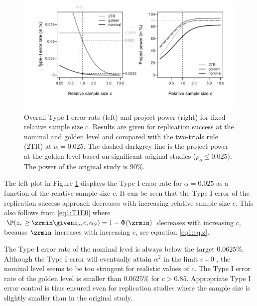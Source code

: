 \begin{figure}[!h]
\centering

\begin{knitrout}
\color{fgcolor}

{\centering \includegraphics[width=\maxwidth]{images/paper1/fig4-1}

}

\end{knitrout}

\caption{Overall Type I error rate (left) and project power (right) for fixed
  relative sample size $c$. Results are given for replication success at the
  nominal and golden level and compared with the two-trials rule (2TR) at
  $\alpha = 0.025$. The dashed darkgrey line is the project power at the golden
  level based on significant original studies ($p_o \leq 0.025$). The power of
  the original study is 90\%.}
\label{fig1:fig4}
\end{figure}


The left plot in Figure \ref{fig1:fig4} displays the Type I error rate for
$\alpha=0.025$ as a function of the relative sample size $c$. It can be seen
that the Type I error of the replication success approach decreases with
increasing relative sample size $c$. This also follows from \eqref{eq1:T1E0}
where \mbox{$\P(z_r \geq \zrmin \given z_o, c, \alpha_S) = 1 - \Phi(\zrmin)$}
decreases with increasing $c$, because $\zrmin$ increases with increasing $c$,
see equation \eqref{eq1:eq.z}.


The Type I error rate of the nominal level is always below the target
$0.0625$\%. Although the Type I error will eventually attain $\alpha^2$ in the
limit $c \downarrow 0$ \citep[Section 3.4]{Held2020}, the nominal level seems to
be too stringent for realistic values of $c$. The Type I error rate of the
golden level is smaller than $0.0625$\% for $c >0.85$. Appropriate Type I error
control is thus ensured even for replication studies where the sample size is
slightly smaller than in the original study.

